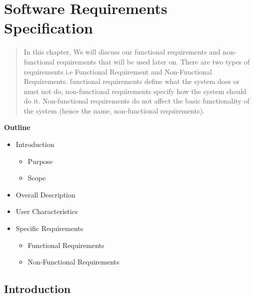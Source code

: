 \section{Software Requirements Specification}

\vspace{20mm}



\begin{abstract}
	In this chapter, We will discuss our
    functional requirements and non-functional
    requirements that will be used later on. There are two types of 
    requirements i.e Functional Requirement and Non-Functional Requirements.
    functional requirements define what the system does or must not do, non-functional
    requirements specify how the system should do it. Non-functional requirements do not
    affect the basic functionality of the system (hence the name, non-functional requirements).
    
\end{abstract}

\vspace{20mm}

\large{\textbf{Outline}}

\begin{center}
    \begin{itemize}
        \item Introduction
              \begin{itemize}
                  \item Purpose
                  \item Scope
              \end{itemize}
        \item Overall Description
        \item User Characteristics
        \item Specific Requirements
              \begin{itemize}
                  \item Functional Requirements
                  \item Non-Functional Requirements
              \end{itemize}
    \end{itemize}
\end{center}
\pagebreak


\subsection{Introduction}

